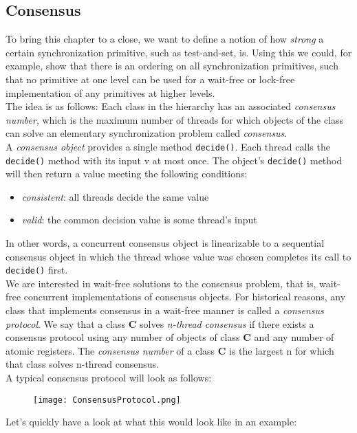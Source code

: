 \documentclass[main]{subfiles}
\begin{document}
\subsection{Consensus} \label{consensus protocol}
To bring this chapter to a close, we want to define a notion of how \textit{strong} a certain synchronization primitive, such as test-and-set, is. Using this we could, for example, show that there is an ordering on all synchronization primitives, such that no primitive at one level can be used for a wait-free or lock-free implementation of any primitives at higher levels. \\[3mm]
The idea is as follows: Each class in the hierarchy has an associated \textit{consensus number}, which is the maximum number of threads for which objects of the class can solve an elementary synchronization problem called \textit{consensus}. \\[3mm]
A \textit{consensus object} provides a single method \texttt{decide()}. Each thread calls the \texttt{decide()} method with its input v at most once. The object's \texttt{decide()} method will then return a value meeting the following conditions:
\begin{itemize}
    \item \textit{consistent}: all threads decide the same value
    \item \textit{valid}: the common decision value is some thread's input
\end{itemize}
In other words, a concurrent consensus object is linearizable to a sequential consensus object in which the thread whose value was chosen completes its call to  \texttt{decide()} first.\\[3mm]
We are interested in wait-free solutions to the consensus problem, that is, wait-free concurrent implementations of consensus objects. For historical reasons, any class that implements consensus in a wait-free manner is called a \textit{consensus protocol}. We say that a class \textbf{C} solves \textit{n-thread consensus} if there exists a consensus protocol using any number of objects of class \textbf{C} and any number of atomic registers. The \textit{consensus number} of a class \textbf{C} is the largest n for which that class solves n-thread consensus.\\[3mm]
A typical consensus protocol will look as follows:
\begin{figure}[H]
    \centering
    \texttt{[image: ConsensusProtocol.png]}
\end{figure}
Let's quickly have a look at what this would look like in an example:
\end{document}
